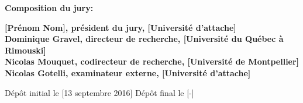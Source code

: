 \thispagestyle{empty}

\null
\vfill
\noindent \textbf{Composition du jury:}\\
\vspace{1cm}

\begin{singlespace}
  \noindent \textbf{[Prénom Nom], président du jury, [Université d’attache]}\\

  \noindent \textbf{Dominique Gravel, directeur de recherche, [Université du Québec à Rimouski]}\\

  \noindent \textbf{Nicolas Mouquet, codirecteur de recherche, [Université de Montpellier]}\\

  \noindent \textbf{Nicolas Gotelli, examinateur externe, [Université d’attache]}\\
\end{singlespace}

\vspace{2cm}
\noindent Dépôt initial le [13 septembre 2016]
\hspace{3cm}
Dépôt final le [-]


\cleardoublepage
